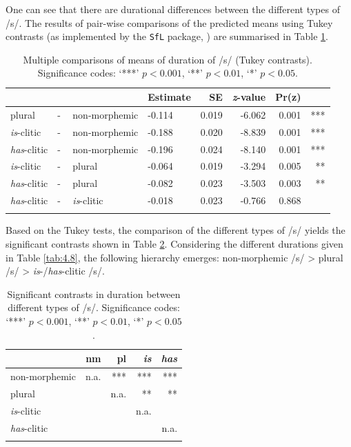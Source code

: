 One can see that there are durational differences between the different types of /s/. The results of pair-wise comparisons of the predicted means using Tukey contrasts (as implemented by the \texttt{SfL} package, \cite{Schmitz2021sfl}) are summarised in Table \ref{tab:4.6}.

\begin{table}\fontsize{10}{11}
\caption{Multiple comparisons of means of duration of /s/ (Tukey contrasts). Significance codes: `***' $p < 0.001$, `**' $p < 0.01$, `*' $p < 0.05$.}
\label{tab:4.6}
\centering
\begin{tabular}{llllrrrr} 
\lsptoprule
~                   & ~ & ~                  & Estimate & SE    & \textit{z}-value & Pr(\textbar{}z\textbar{}) & ~    \\ 
\midrule
plural              & - & non-morphemic      & -0.114   & 0.019 & -6.062           & 
  0.001                  & ***  \\
\textit{is}-clitic  & - & non-morphemic      & -0.188   & 0.020 & -8.839           &  0.001                    & ***  \\
\textit{has}-clitic & - & non-morphemic      & -0.196   & 0.024 & -8.140           & 
  0.001                  & ***  \\
\textit{is}-clitic  & - & plural             & -0.064   & 0.019 & -3.294           & 0.005                     & **   \\
\textit{has}-clitic & - & plural             & -0.082   & 0.023 & -3.503           & 0.003                     & **   \\
\textit{has}-clitic & - & \textit{is}-clitic & -0.018   & 0.023 & -0.766           & 0.868                     & ~    \\
\lspbottomrule
\end{tabular}
\end{table}

Based on the Tukey tests, the comparison of the different types of /s/ yields the significant contrasts shown in Table \ref{tab:4.7}. Considering the different durations given in Table \ref{tab:4.8}, the following hierarchy emerges: non-morphemic /s/ > plural /s/ > \textit{is}-/\textit{has}-clitic /s/.

\begin{table}\fontsize{10}{11}
\caption{Significant contrasts in duration between different types of /s/. Significance codes: `***' $p < 0.001$, `**' $p < 0.01$, `*' $p < 0.05$.}
\label{tab:4.7}
\centering
\begin{tabular}{lrrrr} 
\lsptoprule
~                   & nm   & pl   & \textit{is} & \textit{has}  \\ 
\midrule
non-morphemic       & n.a. & ***  & ***         & ***           \\
plural              & ~    & n.a. & **          & **            \\
\textit{is}-clitic  & ~    & ~    & n.a.        & ~             \\
\textit{has}-clitic & ~    & ~    & ~           & n.a.          \\
\lspbottomrule
\end{tabular}
\end{table}



